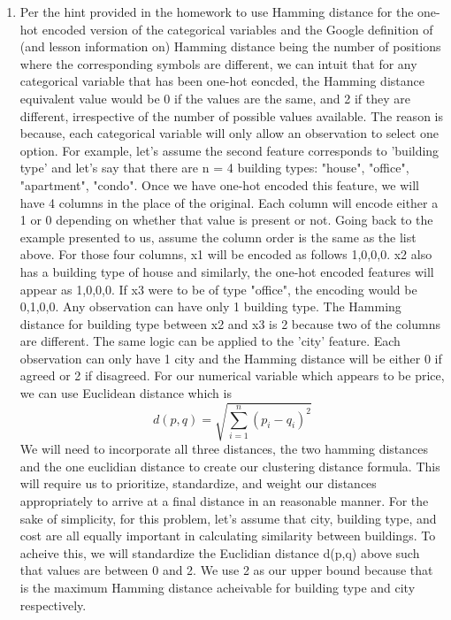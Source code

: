 \documentclass[twoside,10pt]{article}
\begin{document}
\begin{enumerate}
\item Per the hint provided in the homework to use Hamming distance for the one-hot encoded version of the categorical
variables and the Google definition of (and lesson information on) Hamming distance being the number
of positions where the corresponding symbols are different, we can intuit that for any categorical variable
that has been one-hot eoncded, the Hamming distance equivalent value would be 0 if the values are the same,
and 2 if they are different, irrespective of the number of possible values available. The reason is because,
each categorical variable will only allow an observation to select one option. For example, let's assume
the second feature corresponds to 'building type' and let's say that there are n = 4 building types: "house",
"office", "apartment", "condo". Once we have one-hot encoded this feature, we will have 4 columns in the place of
the original. Each column will encode either a 1 or 0 depending on whether that value is present or not.
Going back to the example presented to us, assume the column order is the same as the list above. For those
four columns, x1 will be encoded as follows 1,0,0,0. x2 also has a building type of house and similarly, the
one-hot encoded features will appear as 1,0,0,0. If x3 were to be of type "office", the encoding would
be 0,1,0,0. Any observation can have only 1 building type. The Hamming distance for building type between x2
and x3 is 2 because two of the columns are different. The same logic can be applied to the 'city' feature.
Each observation can only have 1 city and the Hamming distance will be either 0 if agreed or 2 if disagreed.
For our numerical variable which appears to be price, we can use Euclidean distance which is
\begin{equation}
d(p,q) = \sqrt{\sum_{i=1}^{n} \left( p_i - q_i \right)^2}
\end{equation}
We will need to incorporate all three distances, the two hamming distances and the one euclidian distance
to create our clustering distance formula. This will require us to prioritize, standardize, and weight
our distances appropriately to arrive at a final distance in an reasonable manner. For the sake of simplicity,
for this problem, let's assume that city, building type, and cost are all equally important in calculating
similarity between buildings. To acheive this, we will standardize the Euclidian distance d(p,q) above
such that values are between 0 and 2. We use 2 as our upper bound because that is the maximum Hamming distance
acheivable for building type and city respectively.

\end{enumerate}
\end{document}
